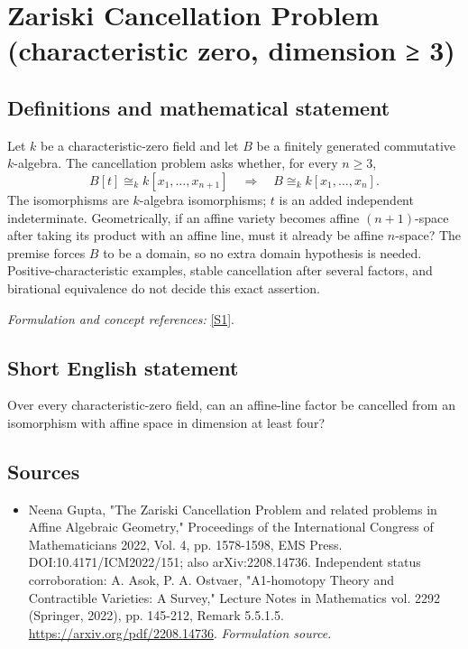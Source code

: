 \documentclass[11pt]{article}
\begin{document}
\section*{\texorpdfstring{Zariski Cancellation Problem (characteristic zero, dimension ≥ 3)}{Zariski Cancellation Problem (characteristic zero, dimension ≥ 3)}}\label{30006919}
\subsection{Definitions and mathematical statement}
Let $k$ be a characteristic-zero field and let $B$ be a finitely generated commutative $k$-algebra. The cancellation problem asks whether, for every $n\ge3$,
\[
 B[t]\cong_k k[x_1,\ldots,x_{n+1}]
 \quad\Longrightarrow\quad B\cong_k k[x_1,\ldots,x_n].
\]
The isomorphisms are $k$-algebra isomorphisms; $t$ is an added independent indeterminate. Geometrically, if an affine variety becomes affine $(n+1)$-space after taking its product with an affine line, must it already be affine $n$-space? The premise forces $B$ to be a domain, so no extra domain hypothesis is needed. Positive-characteristic examples, stable cancellation after several factors, and birational equivalence do not decide this exact assertion.
\par\smallskip\textit{Formulation and concept references:} \href{https://arxiv.org/pdf/2208.14736}{[S1]}.

\subsection{Short English statement}
Over every characteristic-zero field, can an affine-line factor be cancelled from an isomorphism with affine space in dimension at least four?
\subsection{Sources}
\begin{itemize}
\item[S1]Neena Gupta, "The Zariski Cancellation Problem and related problems in Affine Algebraic Geometry," Proceedings of the International Congress of Mathematicians 2022, Vol. 4, pp. 1578-1598, EMS Press. DOI:10.4171/ICM2022/151; also arXiv:2208.14736. Independent status corroboration: A. Asok, P. A. Ostvaer, "A1-homotopy Theory and Contractible Varieties: A Survey," Lecture Notes in Mathematics vol. 2292 (Springer, 2022), pp. 145-212, Remark 5.5.1.5.
\url{https://arxiv.org/pdf/2208.14736}.
\textit{Formulation source.}
\end{itemize}
\end{document}
